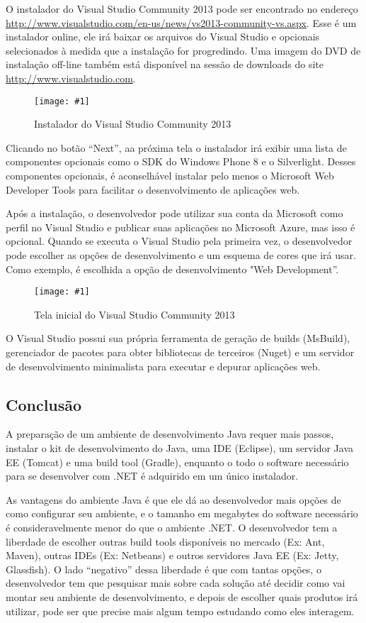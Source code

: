 \documentclass[a4paper,12pt]{article}
\newcommand{\figura}[2] {
	\begin{figure}[ht]
		\centering
		\texttt{[image: \#1]}
		\caption{#2}
	\end{figure}
	\FloatBarrier
}
\begin{document}
O instalador do Visual Studio Community 2013 pode ser encontrado no endereço \url{http://www.visualstudio.com/en-us/news/vs2013-community-vs.aspx}. Esse é um instalador online, ele irá baixar os arquivos do Visual Studio e opcionais selecionados à medida que a instalação for progredindo. Uma imagem do DVD de instalação off-line também está disponível na sessão de downloads do site \url{http://www.visualstudio.com}.

\figura{vs1.png}{Instalador do Visual Studio Community 2013}

Clicando no botão “Next”, aa próxima tela o instalador irá exibir uma lista de componentes opcionais como o SDK do Windows Phone 8 e o Silverlight. Desses componentes opcionais, é aconselhável instalar pelo menos o Microsoft Web Developer Tools para facilitar o desenvolvimento de aplicações web.

Após a instalação, o desenvolvedor pode utilizar sua conta da Microsoft como perfil no Visual Studio e publicar suas aplicações no Microsoft Azure, mas isso é opcional. Quando se executa o Visual Studio pela primeira vez, o desenvolvedor pode escolher as opções de desenvolvimento e um esquema de cores que irá usar. Como exemplo, é escolhida a opção de desenvolvimento "Web Development”.

\figura{vs2.png}{Tela inicial do Visual Studio Community 2013}

O Visual Studio possui sua própria ferramenta de geração de builds (MsBuild), gerenciador de pacotes para obter bibliotecas de terceiros (Nuget) e um servidor de desenvolvimento minimalista para executar e depurar aplicações web. 

\subsection{Conclusão}

A preparação de um ambiente de desenvolvimento Java requer mais passos, instalar o kit de desenvolvimento do Java, uma IDE (Eclipse), um servidor Java EE (Tomcat) e uma build tool (Gradle), enquanto o todo o software necessário para se desenvolver com .NET é adquirido em um único instalador.

As vantagens do ambiente Java é que ele dá ao desenvolvedor mais opções de como configurar seu ambiente, e o tamanho em megabytes do software necessário é consideravelmente menor do que o ambiente .NET. O desenvolvedor tem a liberdade de escolher outras build tools disponíveis no mercado (Ex: Ant, Maven), outras IDEs (Ex: Netbeans) e outros servidores Java EE (Ex: Jetty, Glassfish). O lado “negativo” dessa liberdade é que com tantas opções, o desenvolvedor tem que pesquisar mais sobre cada solução até decidir como vai montar seu ambiente de desenvolvimento, e depois de escolher quais produtos irá utilizar, pode ser que precise mais algum tempo estudando como eles interagem.
\end{document}
